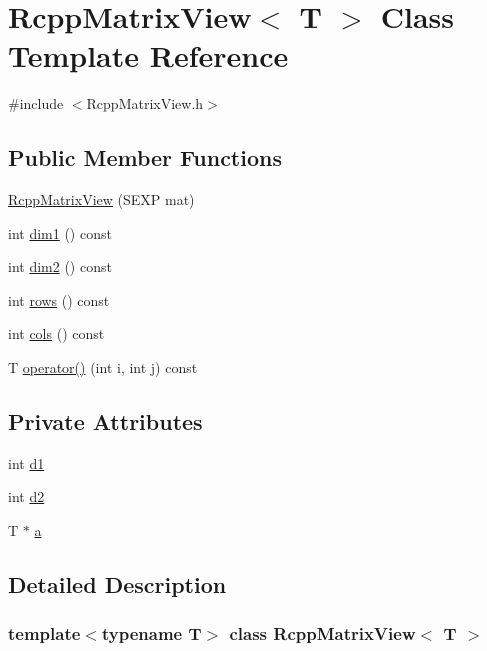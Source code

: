 \hypertarget{classRcppMatrixView}{
\section{RcppMatrixView$<$ T $>$ Class Template Reference}
\label{classRcppMatrixView}
}


{\ttfamily \#include $<$RcppMatrixView.h$>$}\subsection*{Public Member Functions}
\begin{DoxyCompactItemize}
\item 
\hyperlink{classRcppMatrixView_ac3489c6a24c2975f3ea7103ada50e328}{RcppMatrixView} (SEXP mat)
\item 
int \hyperlink{classRcppMatrixView_a72d1d7fcdc4b1cc6dd877b1df2f9f5e6}{dim1} () const 
\item 
int \hyperlink{classRcppMatrixView_aebb7f65646ce780c897dc39f31899439}{dim2} () const 
\item 
int \hyperlink{classRcppMatrixView_aa9760806a822cd988264e1dbdc1f6c37}{rows} () const 
\item 
int \hyperlink{classRcppMatrixView_a417b875d8d7dde8130c3b294312c930d}{cols} () const 
\item 
T \hyperlink{classRcppMatrixView_ad135a7e855eee55b078807766aff9e96}{operator()} (int i, int j) const 
\end{DoxyCompactItemize}
\subsection*{Private Attributes}
\begin{DoxyCompactItemize}
\item 
int \hyperlink{classRcppMatrixView_ad492401691ef709f6d2ef7dc1dcc2134}{d1}
\item 
int \hyperlink{classRcppMatrixView_a37b5f5806957eeb0b688d6a157a2a264}{d2}
\item 
T $\ast$ \hyperlink{classRcppMatrixView_ad38481118f63a84a132e8f2265de5bdd}{a}
\end{DoxyCompactItemize}


\subsection{Detailed Description}
\subsubsection*{template$<$typename T$>$ class RcppMatrixView$<$ T $>$}



